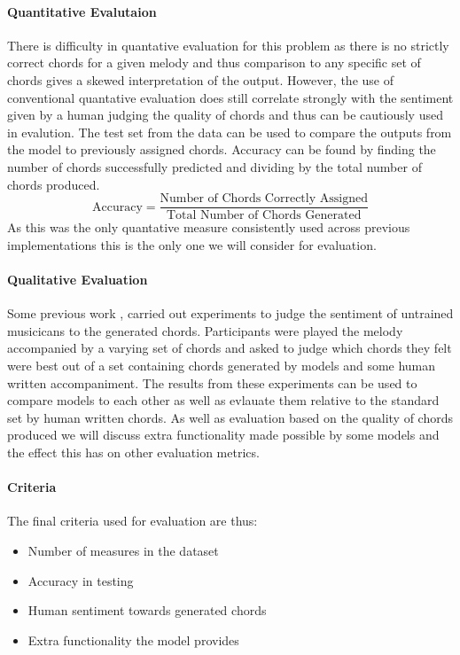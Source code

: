 \paragraph{Quantitative Evalutaion}
There is difficulty in quantative evaluation for this problem as there is no strictly correct chords for a given melody and thus comparison to any specific set of chords gives a skewed interpretation of the output.
However, the use of conventional quantative evaluation does still correlate strongly with the sentiment given by a human judging the quality of chords and thus can be cautiously used in evalution.
The test set from the data can be used to compare the outputs from the model to previously assigned chords. Accuracy can be found by finding the number of chords successfully predicted and dividing by the total number of chords produced.
\begin{equation}
    \text{Accuracy} = \frac{\text{Number of Chords Correctly Assigned}}{\text{Total Number of Chords Generated}}
\end{equation}
As this was the only quantative measure consistently used across previous implementations this is the only one we will consider for evaluation.

\paragraph{Qualitative Evaluation}
Some previous work \cite{MySong}, \cite{BLSTM} carried out experiments to judge the sentiment of untrained musicicans to the generated chords.
Participants were played the melody accompanied by a varying set of chords and asked to judge which chords they felt were best out of a set containing chords generated by models and some human written accompaniment.
The results from these experiments can be used to compare models to each other as well as evlauate them relative to the standard set by human written chords.
As well as evaluation based on the quality of chords produced we will discuss extra functionality made possible by some models and the effect this has on other evaluation metrics.

\paragraph{Criteria}
The final criteria used for evaluation are thus:
\begin{itemize}
    \item Number of measures in the dataset
    \item Accuracy in testing
    \item Human sentiment towards generated chords
    \item Extra functionality the model provides
\end{itemize}

